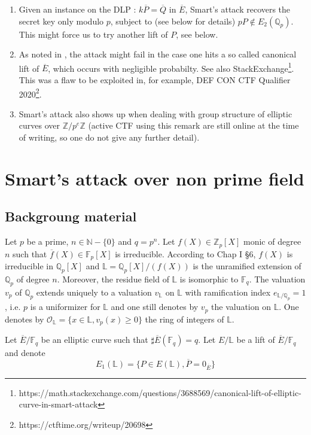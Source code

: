\documentclass[10pt]{article}
\theoremstyle{definition}
\newcommand{\N}{\mathbb{N}}
\newcommand{\F}{\mathbb{F}}
\renewcommand{\L}{\mathbb{L}}
\newcommand{\Z}{\mathbb{Z}}
\newcommand{\Q}{\mathbb{Q}}
\begin{document}
\begin{enumerate}
\item Given an instance on the DLP  : $k\overline{P} = \overline{Q}$ in $\overline{E}$, Smart's attack recovers the secret key only modulo $p$, subject to (see below for details) $pP \notin E_2(\Q_p)$.
This might force us to try another lift of $P$, see below. 
\item As noted in \cite{Sma99}, the attack might fail in the case one hits a so called canonical lift of $\overline{E}$, which occurs with negligible probabilty. 
See also StackExchange\footnote{https://math.stackexchange.com/questions/3688569/canonical-lift-of-elliptic-curve-in-smart-attack}.
This was a flaw to be exploited in, for example, DEF CON CTF Qualifier 2020\footnote{https://ctftime.org/writeup/20698}.
\item Smart's attack also shows up when dealing with group structure of elliptic curves over $\Z/p^e\Z$ \cite{Sala_2024} (active CTF using this remark are still online at the time of writing, so one do not give any further detail).
\end{enumerate} 

\section{Smart's attack over non prime field}

\subsection{Backgroung material}

Let $p$ be a prime, $n \in \N - \lbrace 0 \rbrace$ and $q = p^n$.
Let $f(X) \in \Z_p[X]$ monic of degree $n$ such that $\overline{f}(X) \in \F_p[X] $ is irreducible.
According to \cite{Serre-CL} Chap I \S 6, $f(X)$ is irreducible in $\Q_p[X]$ and $\L = \Q_p[X]/(f(X))$ is the unramified extension of $\Q_p$ of degree $n$.
Moreover, the residue field of $\L$ is isomorphic to $\F_q$.
The valuation $v_p$ of $\Q_p$ extends uniquely to a valuation $v_{\L}$ on $\L$ with ramification index $e_{\L/\Q_p} = 1$, i.e. $p$ is a uniformizer for $\L$ and one still denotes by $v_p$ the valuation on $\L$.
One denotes by $\mathcal{O}_{\L} = \lbrace x \in \L , v_p(x)  \geq 0 \rbrace$ the ring of integers of $\L$.


Let $\overline{E}/\F_q$ be an elliptic curve such that $\sharp \overline{E}(\F_q) = q$.
Let $E/\L$ be a lift of $\overline{E}/\F_q$ and denote
\[
E_1(\L) = \lbrace P \in E(\L), \overline{P} = 0_{\overline{E}} \rbrace 
\]
\end{document}
